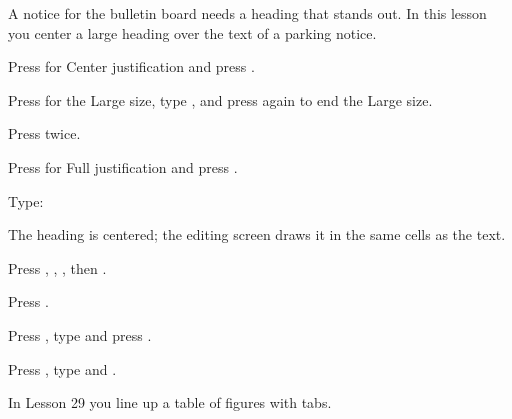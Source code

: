 A notice for the bulletin board needs a heading that stands out.  In this
lesson you center a large heading over the text of a parking notice.

\begin{WPSteps}
\item Press  for Center justification and press
.
\item Press  for the Large size, type
, and press  again to end
the Large size.
\item Press  twice.
\end{WPSteps}

\begin{WPSteps}
\item Press  for Full justification and press
.
\item Type:
\end{WPSteps}
The heading is centered; the editing screen draws it in the same cells as
the text.

\begin{WPSteps}
\item Press , , , then
.
\end{WPSteps}
\begin{WPSteps}[resume]
\item Press .
\item Press , type  and press
.
\item Press , type  and .
\end{WPSteps}
\EndReplay
In Lesson 29 you line up a table of figures with tabs.
